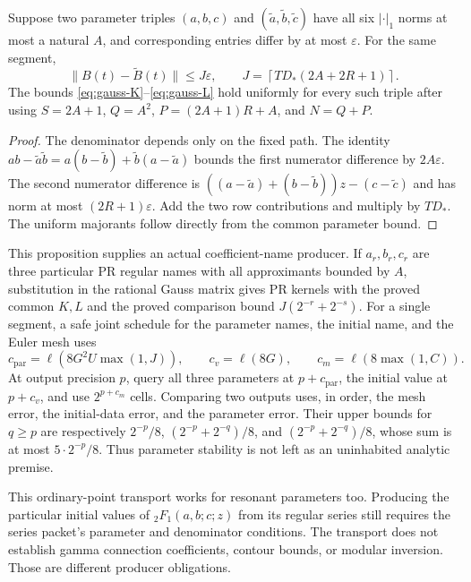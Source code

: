 \begin{proposition}
\label{prop:gauss-parameter-stability}
Suppose two parameter triples $(a,b,c)$ and $(\widetilde a,\widetilde b,
\widetilde c)$ have all six $|\cdot|_1$ norms at most a natural $A$, and
corresponding entries differ by at most $\varepsilon$. For the same segment,
\[
 \lVert B(t)-\widetilde B(t)\rVert\le J\varepsilon,
 \qquad
 J=\left\lceil TD_*(2A+2R+1)\right\rceil.
\]
The bounds \eqref{eq:gauss-K}--\eqref{eq:gauss-L} hold uniformly for every
such triple after using
$S=2A+1$, $Q=A^2$, $P=(2A+1)R+A$, and $N=Q+P$.
\end{proposition}
\begin{proof}
The denominator depends only on the fixed path. The identity
$ab-\widetilde a\widetilde b=a(b-\widetilde b)+
\widetilde b(a-\widetilde a)$ bounds the first numerator difference by
$2A\varepsilon$. The second numerator difference is
$((a-\widetilde a)+(b-\widetilde b))z-(c-\widetilde c)$ and has norm at most
$(2R+1)\varepsilon$. Add the two row contributions and multiply by $TD_*$.
The uniform majorants follow directly from the common parameter bound.
\end{proof}

This proposition supplies an actual coefficient-name producer. If $a_r,b_r,c_r$
are three particular PR regular names with all approximants bounded by $A$,
substitution in the rational Gauss matrix gives PR kernels with the proved
common $K,L$ and the proved comparison bound $J(2^{-r}+2^{-s})$.
For a single segment, a safe joint schedule for the parameter names, the
initial name, and the Euler mesh uses
\[
 c_{\mathrm{par}}=\ell(8G^2U\max(1,J)),\qquad
 c_v=\ell(8G),\qquad c_m=\ell(8\max(1,C)).
\]
At output precision $p$, query all three parameters at $p+c_{\mathrm{par}}$,
the initial value at $p+c_v$, and use $2^{p+c_m}$ cells.
Comparing two outputs uses, in order, the mesh error, the initial-data error,
and the parameter error. Their upper bounds for $q\ge p$ are respectively
$2^{-p}/8$, $(2^{-p}+2^{-q})/8$, and
$(2^{-p}+2^{-q})/8$, whose sum is at most $5\cdot2^{-p}/8$.
Thus parameter stability is not left as an uninhabited analytic premise.

This ordinary-point transport works for resonant parameters too. Producing
the particular initial values of ${}_2F_1(a,b;c;z)$ from its regular series
still requires the series packet's parameter and denominator conditions.
The transport does not establish gamma connection coefficients, contour
bounds, or modular inversion. Those are different producer obligations.

